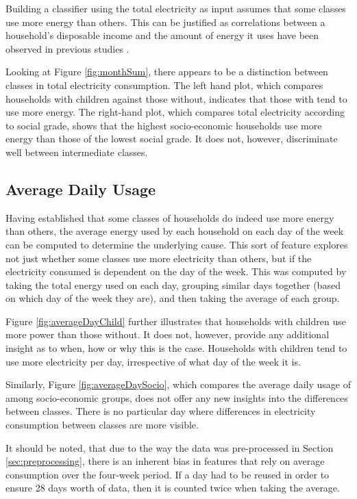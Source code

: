 Building a classifier using the total electricity as input assumes that some classes use more energy than others. This can be justified as correlations between a household's disposable income and the amount of energy it uses have been observed in previous studies \cite{Gomez}.

\monthSum %

Looking at Figure \ref{fig:monthSum}, there appears to be a distinction between classes in total electricity consumption. The left hand plot, which compares households with children against those without, indicates that those with tend to use more energy. The right-hand plot, which compares total electricity according to social grade, shows that the highest socio-economic households use more energy than those of the lowest social grade. It does not, however, discriminate well between intermediate classes.

\subsection*{Average Daily Usage}
Having established that some classes of households do indeed use more energy than others, the average energy used by each household on each day of the week can be computed to determine the underlying cause. This sort of feature explores not just whether some classes use more electricity than others, but if the electricity consumed is dependent on the day of the week. This was computed by taking the total energy used on each day, grouping similar days together (based on which day of the week they are), and then taking the average of each group.

\averageDayChild %
\averageDaySocio %

Figure \ref{fig:averageDayChild} further illustrates that households with children use more power than those without. It does not, however, provide any additional insight as to when, how or why this is the case. Households with children tend to use more electricity per day, irrespective of what day of the week it is.

Similarly, Figure \ref{fig:averageDaySocio}, which compares the average daily usage of among socio-economic groups, does not offer any new insights into the differences between classes. There is no particular day where differences in electricity consumption between classes are more visible.

It should be noted, that due to the way the data was pre-processed in Section \ref{sec:preprocessing}, there is an inherent bias in features that rely on average consumption over the four-week period. If a day had to be reused in order to ensure 28 days worth of data, then it is counted twice when taking the average. 


